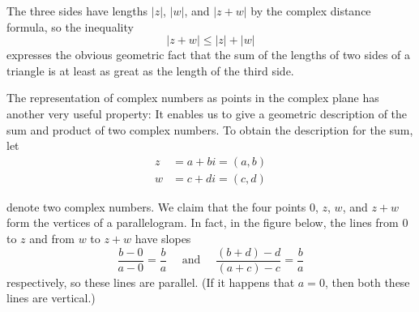 \documentclass{ximera}
\begin{document}
\begin{center}
\end{center}


The three sides have lengths $|z|$, $|w|$, and $|z + w|$ by the complex distance formula, so the inequality
\begin{equation*}
|z+w| \leq |z| + |w|
\end{equation*}
expresses the obvious geometric fact that the sum of the lengths of two
sides of a triangle is at least as great as the length of the third
side.

The representation of complex numbers
as points in the complex plane has another very useful property: It
enables us to give a geometric description of the sum and product of two
 complex numbers. To obtain the description for the sum, let
\begin{align*}
z & = a+bi = (a,b) \\
w & = c+di = (c,d)
\end{align*}

denote two complex numbers. We claim that the four points $0$, $z$, $w$, and $z + w$ form the vertices of a parallelogram. In fact, in the figure below, the lines from $0$ to $z$ and from $w$ to $z + w$ have slopes
\begin{equation*}
\frac{b-0}{a-0} = \frac{b}{a} \quad \mbox{ and } \quad \frac{(b+d)-d}{(a+c)-c} = \frac{b}{a}
\end{equation*}
respectively, so these lines are parallel. (If it happens that $a = 0$, then both these lines are vertical.) 

\begin{center}
\end{center}
\end{document}
